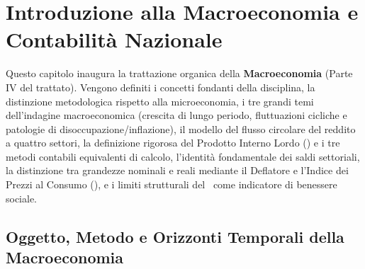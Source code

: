\chapter{Introduzione alla Macroeconomia e Contabilità Nazionale}
\label{chap:introduzione_macroeconomia}

\begin{tcolorbox}[colback=navyblue!5!white, colframe=navyblue, title=\textbf{Quadro Concettuale del Capitolo}]
Questo capitolo inaugura la trattazione organica della \textbf{Macroeconomia} (Parte IV del trattato). Vengono definiti i concetti fondanti della disciplina, la distinzione metodologica rispetto alla microeconomia, i tre grandi temi dell'indagine macroeconomica (crescita di lungo periodo, fluttuazioni cicliche e patologie di disoccupazione/inflazione), il modello del flusso circolare del reddito a quattro settori, la definizione rigorosa del Prodotto Interno Lordo (\PIL) e i tre metodi contabili equivalenti di calcolo, l'identità fondamentale dei saldi settoriali, la distinzione tra grandezze nominali e reali mediante il Deflatore e l'Indice dei Prezzi al Consumo (), e i limiti strutturali del \PIL\ come indicatore di benessere sociale.
\end{tcolorbox}

\section{Oggetto, Metodo e Orizzonti Temporali della Macroeconomia}

